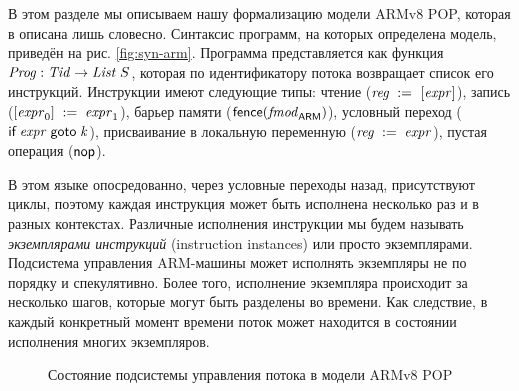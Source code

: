 В этом разделе мы описываем нашу формализацию модели ARMv8 POP, которая в \cite{Flur-al:POPL16}
описана лишь словесно.
Синтаксис программ, на которых определена модель, приведён на рис. \ref{fig:syn-arm}.
Программа представляется как функция $\mathit{Prog} : \mathit{Tid} \rightarrow \mathit{List}\;{S}$, которая по
идентификатору потока возвращает список его инструкций.
Инструкции имеют следующие типы: чтение ($\mathit{reg} \;:=_{}\;[\mathit{expr}]$), запись ($[\mathit{expr}_0]\;:=\;\mathit{expr}_1$),
барьер памяти ($\mathsf{fence}({\mathit{fmod}_{\mathsf{ARM}}})$), условный переход ($\textsf{if} \; \mathit{expr} \; \textsf{goto} \; \mathit{k}$),
присваивание в локальную переменную ($\mathit{reg}\;:=\;\mathit{expr}$),
пустая операция ($\textsf{nop}$).

В этом языке опосредованно, через условные переходы назад, присутствуют циклы,
поэтому каждая инструкция может быть исполнена несколько раз и в разных контекстах.
Различные исполнения инструкции мы будем называть \emph{экземплярами инструкций} (instruction instances)
или просто экземплярами.
Подсистема управления ARM-машины может исполнять экземпляры не по порядку и спекулятивно.
Более того, исполнение экземпляра происходит за несколько шагов, которые могут быть разделены во времени.
Как следствие, в каждый конкретный момент времени поток может находится в состоянии исполнения многих экземпляров.

\newcommand{\tapeFont}{\small}
\begin{figure}
\begin{center}
\end{center}
\caption{Состояние подсистемы управления потока в модели ARMv8 POP}
\label{fig:armvpop:dag}
\end{figure}

